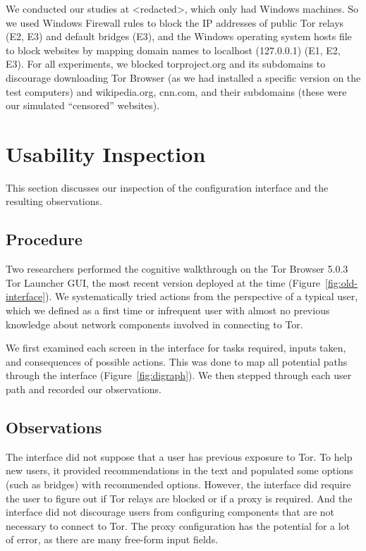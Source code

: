 \documentclass[USenglish,oneside,twocolumn]{article}
\begin{document}
We conducted our studies at <redacted>, which only had Windows machines. 
So we used Windows Firewall rules to block the IP addresses of public Tor relays (E2, E3) and default bridges (E3),
and the Windows operating system hosts file to block websites by
mapping domain names to localhost (127.0.0.1) (E1, E2, E3). For all experiments, we blocked torproject.org and its subdomains to discourage downloading Tor Browser (as we had installed a specific version on the test computers) and wikipedia.org, cnn.com, and their subdomains (these were our simulated ``censored'' websites). 

\section{Usability Inspection}
\label{sec:inspection}
This section discusses our inspection of the configuration interface and the resulting observations.

\subsection{Procedure} 
Two researchers performed the cognitive walkthrough on the Tor Browser 5.0.3 Tor Launcher GUI, the most recent version deployed at the time (Figure~\ref{fig:old-interface}). We systematically tried actions from the perspective of a typical user, which we defined as a first time or infrequent user with almost no previous knowledge about network components involved in connecting to Tor.

We first examined each screen in the interface for tasks required, inputs taken, and consequences of possible actions. This was done to map all potential paths through the interface (Figure~\ref{fig:digraph}). We then stepped through each user path and recorded our observations. 

\subsection{Observations}
The interface did not suppose that a user has previous exposure to Tor. To help new users, it provided recommendations in the text and populated some options (such as bridges) with recommended options. However, the interface did require the user to figure out if Tor relays are blocked or if a proxy is required. And the interface did not discourage users from configuring components that are not necessary to connect to Tor. The proxy configuration has the potential for a lot of error, as there are many free-form input fields. 
\end{document}
